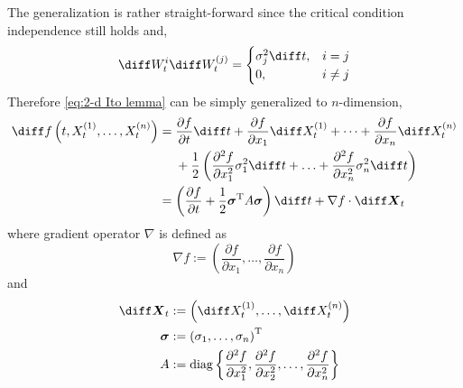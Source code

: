 \begin{subproblem}[(\alph*)]
        \item
        The generalization is rather straight-forward since
        the critical condition independence still holds and,
        \[\diff W_t^{i}\diff W_t^{(j)}=
        \begin{cases}
            \sigma_j^2\diff t,&i=j\\
            0,&i\neq j
        \end{cases}\]
        Therefore \cref{eq:2-d Ito lemma} can be simply generalized
        to $n$-dimension,
        \begin{equation*}
            \begin{aligned}
            \diff f\left(t,X_t^{(1)},\ldots,X_t^{(n)}\right)&=
            \begin{aligned}[t]
            &\frac{\partial f}{\partial t}\diff t
            +\frac{\partial f}{\partial x_1}\diff X_t^{(1)}
            +\cdots
            +\frac{\partial f}{\partial x_n}\diff X_t^{(n)}\\
            &+\frac{1}{2}\left(
                \frac{\partial^2 f}{\partial x_1^2}\sigma_1^2\diff t
                +\ldots
                +\frac{\partial^2 f}{\partial x_n^2}\sigma_n^2\diff t
            \right)
            \end{aligned}\\
            &=\left(\frac{\partial f}{\partial t}
            +\frac{1}{2}\boldsymbol\sigma^\trans A\boldsymbol\sigma\right)\diff t
            +\nabla f\cdot\diff\boldsymbol X_t
            \end{aligned}
        \end{equation*}
        where gradient operator $\nabla$ is defined as
        \[\nabla f:=\left(\frac{\partial f}{\partial x_1},\ldots,\frac{\partial f}{\partial x_n}\right)\]
        and
        \[\begin{aligned}
            \diff\boldsymbol X_t&:=
            \left(\diff X_t^{(1)},\ldots,\diff X_t^{(n)}\right)\\
            \boldsymbol\sigma&:=
            \left(\sigma_1,\ldots,\sigma_n\right)^\trans\\
            A&:=\mathrm{diag}\left\{\frac{\partial^2 f}{\partial x_1^2},
           \frac{\partial^2 f}{\partial x_2^2},\ldots,
           \frac{\partial^2 f}{\partial x_n^2}\right\}
        \end{aligned}\]
        

\end{subproblem}
